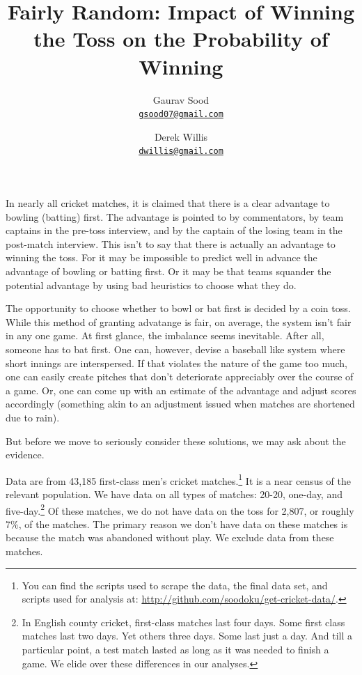 \documentclass[11pt]{article}
\begin{document}
\title{\vspace{-1.5cm}\normalsize{\textbf{Fairly Random: Impact of Winning the Toss on the Probability of Winning}}}
\author{Gaurav Sood\\\small{\href{mailto:gsood07@gmail.com}{\tt{gsood07@gmail.com}}} \and Derek Willis\\\small{\href{mailto:dwillis@gmail.com}{\tt{dwillis@gmail.com}}}}
\maketitle
\doublespacing

In nearly all cricket matches, it is claimed that there is a clear advantage to bowling (batting) first. The advantage is pointed to by commentators, by team captains in the pre-toss interview, and by the captain of the losing team in the post-match interview. This isn't to say that there is actually an advantage to winning the toss. For it may be impossible to predict well in advance the advantage of bowling or batting first. Or it may be that teams squander the potential advantage by using bad heuristics to choose what they do.

The opportunity to choose whether to bowl or bat first is decided by a coin toss. While this method of granting advatange is fair, on average, the system isn't fair in any one game. At first glance, the imbalance seems inevitable. After all, someone has to bat first. One can, however, devise a baseball like system where short innings are interspersed. If that violates the nature of the game too much, one can easily create pitches that don't deteriorate appreciably over the course of a game. Or, one can come up with an estimate of the advantage and adjust scores accordingly (something akin to an adjustment issued when matches are shortened due to rain).

But before we move to seriously consider these solutions, we may ask about the evidence.

Data are from 43,185 first-class men's cricket matches.\footnote{You can find the scripts used to scrape the data, the final data set, and scripts used for analysis at: \href{http://github.com/soodoku/get-cricket-data/}{http://github.com/soodoku/get-cricket-data/}.} It is a near census of the relevant population. We have data on all types of matches: 20-20, one-day, and five-day.\footnote{In English county cricket, first-class matches last four days. Some first class matches last two days. Yet others three days. Some last just a day. And till a particular point, a test match lasted as long as it was needed to finish a game. We elide over these differences in our analyses.} Of these matches, we do not have data on the toss for 2,807, or roughly 7\%, of the matches. The primary reason we don't have data on these matches is because the match was abandoned without play. We exclude data from these matches. 
\end{document}
